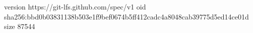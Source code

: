 version https://git-lfs.github.com/spec/v1
oid sha256:bbd0b03831138b503e1f9bef0674b5ff412cadc4a8048cab39775d5ed14ce01d
size 87544

